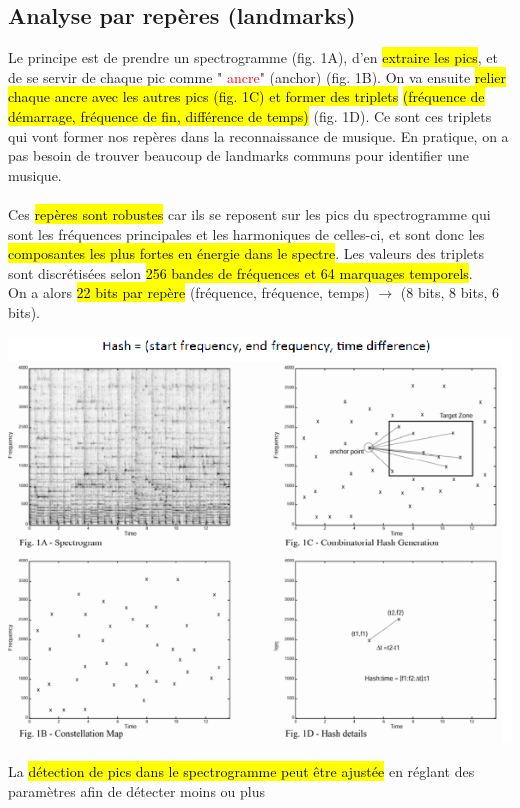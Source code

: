 \documentclass[letterpaper, 12pt]{article}
\newcommand{\alinea}{
\hspace*{0.5cm}}
\newcommand{\red}[1]{
	\textcolor{red}{#1}}
\begin{document}
		\subsection{Analyse par repères (landmarks)}
			\alinea Le principe est de prendre un spectrogramme (fig. 1A), d'en \hl{extraire les pics}, et de se servir de chaque pic
				comme "\red{ancre}" (anchor) (fig. 1B). On va ensuite \hl{relier chaque ancre avec les autres pics (fig. 1C) et 
				former des triplets} \hl{(fréquence de démarrage, fréquence de fin, différence de temps)} (fig. 1D). Ce sont ces 
				triplets qui vont former nos repères dans la reconnaissance de musique. En pratique, on a pas besoin de trouver 
				beaucoup de landmarks communs pour identifier une musique.\\
			~\\
			\alinea Ces \hl{repères sont robustes} car ils se reposent sur les pics du spectrogramme qui sont les fréquences principales 
				et les harmoniques de celles-ci, et sont donc les \hl{composantes les plus fortes en énergie dans le spectre}. 
				Les valeurs des triplets sont discrétisées selon \hl{256 bandes de fréquences et 64 marquages temporels}.\\
				On a alors \hl{22 bits par repère} (fréquence, fréquence, temps) $\rightarrow$ (8 bits, 8 bits, 6 bits).
			\begin{center}
				\includegraphics[width=\textwidth]{Images/landmark}
			\end{center}
			\alinea La \hl{détection de pics dans le spectrogramme peut être ajustée} en réglant des paramètres afin de détecter moins ou plus 
\end{document}
